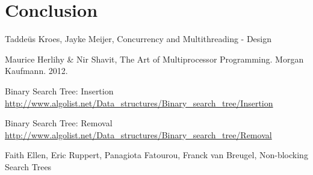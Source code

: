 \documentclass[a4paper]{article}
\begin{document}
\section{Conclusion}

\begin{thebibliography}{}
    Taddeüs Kroes, Jayke Meijer, Concurrency and Multithreading - Design

    Maurice Herlihy \& Nir Shavit, The Art of Multiprocessor Programming. Morgan Kaufmann.
    2012.

    Binary Search Tree: Insertion
    \url{http://www.algolist.net/Data_structures/Binary_search_tree/Insertion}

    Binary Search Tree: Removal
    \url{http://www.algolist.net/Data_structures/Binary_search_tree/Removal}

    Faith Ellen, Eric Ruppert, Panagiota Fatourou, Franck van Breugel, Non-blocking Search
    Trees

\end{thebibliography}
\end{document}
